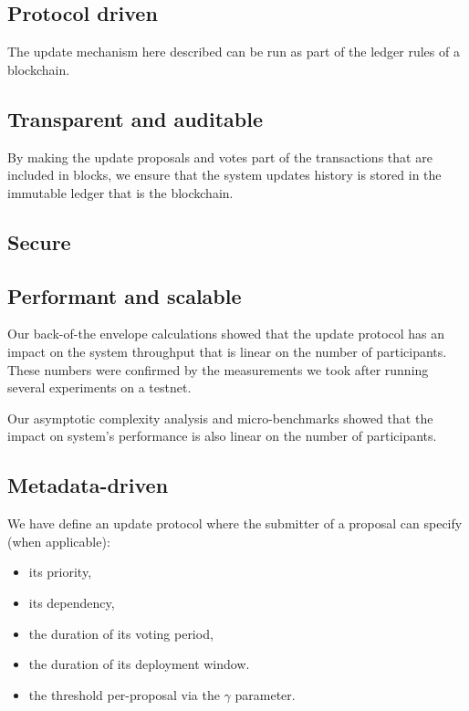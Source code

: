 \documentclass[11pt,a4paper]{article}
\begin{document}
\subsection{Protocol driven}
\label{sec:sat-protocol-driven}

The update mechanism here described can be run as part of the ledger rules of a
blockchain.

\subsection{Transparent and auditable}
\label{sec:sat-transp-audit}

By making the update proposals and votes part of the transactions that are
included in blocks, we ensure that the system updates history is stored in the
immutable ledger that is the blockchain.

\subsection{Secure}
\label{sec:sat-secure}

%
%
%

\subsection{Performant and scalable}
\label{sec:sat-performant-scalable}

Our back-of-the envelope calculations showed that the update protocol has an
impact on the system throughput that is linear on the number of participants.
These numbers were confirmed by the measurements we took after running several
experiments on a testnet.

Our asymptotic complexity analysis and micro-benchmarks showed that the impact
on system's performance is also linear on the number of participants.

\subsection{Metadata-driven}
\label{sec:sat-metadata-driven}

We have define an update protocol where the submitter of a proposal can specify
(when applicable):
\begin{itemize}
\item its priority,
\item its dependency,
\item the duration of its voting period,
\item the duration of its deployment window.
\item the threshold per-proposal via the $\gamma$ parameter.
\end{itemize}
\end{document}
